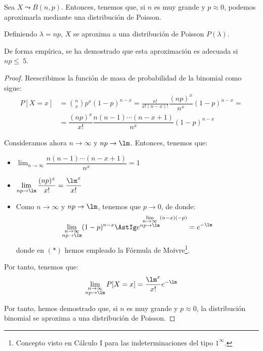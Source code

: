 \begin{prop}
    Sea $X\leadsto B(n,p)$. Entonces, tenemos que, si $n$ es muy grande y $p\approx 0$, podemos aproximarla mediante una distribución de Poisson.
    
    Definiendo $\lambda=np$, $X$ se aproxima a una distribución de Poisson $P(\lambda)$.

    De forma empírica, se ha demostrado que esta aproximación es adecuada si $np\leq~5$.
\end{prop}
\begin{proof}
    Reescribimos la función de masa de probabilidad de la binomial como sigue:
    \begin{align*}
        P[X=x] &= \binom{n}{x}p^x(1-p)^{n-x} = \frac{n!}{x!(n-x)!}\dfrac{(np)^x}{n^x}(1-p)^{n-x}
        =\\&= \dfrac{(np)^x}{x!}\dfrac{n(n-1)\cdots (n-x+1)}{n^x}(1-p)^{n-x}
    \end{align*}

    Consideramos ahora $n\to \infty$ y $np\to\lm$. Entonces, tenemos que:
    \begin{itemize}
        \item $\displaystyle \lim_{n\to \infty}\dfrac{n(n-1)\cdots (n-x+1)}{n^x} = 1$
        \item $\displaystyle \lim_{np\to \lm}\dfrac{(np)^x}{x!} = \dfrac{\lm^x}{x!}$
        \item Como $n\to \infty$ y $np\to \lm$, tenemos que $p\to 0$, de donde:
        \begin{equation*}
            \lim_{\substack{n\to \infty\\np\to \lm}}(1-p)^{n-x}
            \AstIg e^{\lim\limits_{\substack{n\to \infty\\np\to \lm}}(n-x)(-p)} = e^{-\lm}
        \end{equation*}
        donde en $(\ast)$ hemos empleado la Fórmula de Moivre\footnote{Concepto visto en Cálculo I para las indeterminaciones del tipo $1^\infty$.}.
    \end{itemize}

    Por tanto, tenemos que:
    \begin{equation*}
        \lim_{\substack{n\to \infty\\np\to \lm}}P[X=x] = \frac{\lm^x}{x!}e^{-\lm}
    \end{equation*}

    Por tanto, hemos demostrado que, si $n$ es muy grande y $p\approx 0$, la distribución binomial se aproxima a una distribución de Poisson.
\end{proof}


